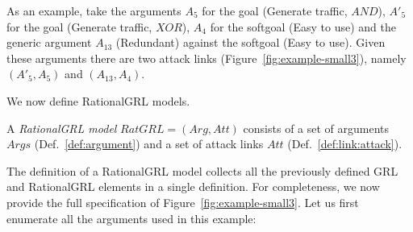 As an example, take the arguments $A_5$ for the goal (Generate traffic, $AND$), $A'_5$ for the goal (Generate traffic, $XOR$), $A_4$ for the softgoal (Easy to use) and the generic argument $A_{13}$ (Redundant) against the softgoal (Easy to use). Given these arguments there are two attack links (Figure~\ref{fig:example-small3}), namely $(A'_{5},A_{5})$ and $(A_{13}, A_{4})$.

We now define RationalGRL models.

\begin{definition}
\label{def:rationalgrl-model}
A \emph{RationalGRL model} $RatGRL=(Arg, Att)$ consists of a set of arguments $Args$ (Def.~\ref{def:argument}) and a set of attack links $Att$ (Def.~\ref{def:link:attack}).
\end{definition}

The definition of a RationalGRL model collects all the previously defined GRL and RationalGRL elements in a single definition. For completeness, we now provide the full specification of Figure~\ref{fig:example-small3}. Let us first enumerate all the arguments used in this example:


